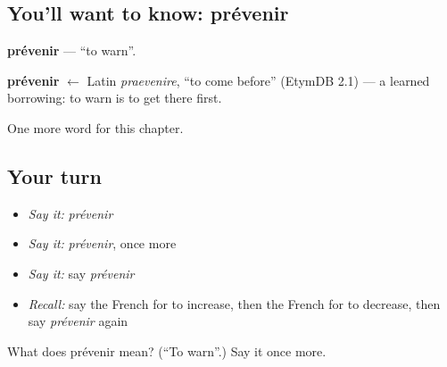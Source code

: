 \subsection*{You'll want to know: prévenir}
\textbf{prévenir} — \textquotedblleft{}to warn\textquotedblright{}.

\begin{cousinweb}
\textbf{prévenir} $\leftarrow$ Latin \emph{praevenire}, \textquotedblleft{}to come before\textquotedblright{} (EtymDB 2.1) — a learned borrowing: to warn is to get there first.
\end{cousinweb}

\begin{grammarlens}[title={What you've built}]
One more word for this chapter.
\end{grammarlens}

\subsection*{Your turn}
\begin{itemize}
\raggedright
  \item \emph{Say it:} \emph{prévenir}
  \item \emph{Say it:} \emph{prévenir}, once more
  \item \emph{Say it:} say \emph{prévenir}
  \item \emph{Recall:} say the French for to increase, then the French for to decrease, then say \emph{prévenir} again
\end{itemize}

\begin{tcolorbox}[breakable,colback=teal!4,colframe=teal!35!black,title={Before you move on}]
What does prévenir mean? (\textquotedblleft{}To warn\textquotedblright{}.) Say it once more.
\end{tcolorbox}
